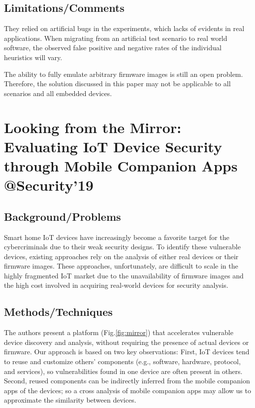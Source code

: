 \subsection{Limitations/Comments}
They relied on artificial bugs in the experiments, which lacks of evidents in real applications. When migrating from an artificial test scenario to real world software, the observed false positive and negative rates of the individual heuristics will vary.

The ability to fully emulate arbitrary firmware images is still an open problem. Therefore, the solution discussed in this paper may not be applicable to all scenarios and all embedded devices. 

\newpage

\section{Looking from the Mirror: Evaluating IoT Device Security through Mobile Companion Apps @Security'19}
\subsection{Background/Problems}
Smart home IoT devices have increasingly become a favorite target for the cybercriminals due to their weak security designs. To identify these vulnerable devices, existing approaches rely on the analysis of either real devices or their firmware images. These approaches, unfortunately, are difficult to scale in the highly fragmented IoT market due to the unavailability of firmware images and the high cost involved in acquiring real-world devices for security analysis.

\subsection{Methods/Techniques}
The authors present a platform (Fig.\ref{fig:mirror}) that accelerates vulnerable device discovery and analysis, without requiring the presence of actual devices or firmware. Our approach is based on two key observations: First, IoT devices tend to reuse and customize others’ components (e.g., software, hardware, protocol, and services), so vulnerabilities found in one device are often present in others. Second, reused components can be indirectly inferred from the mobile companion apps of the devices; so a cross analysis of mobile companion apps may allow us to approximate the similarity between devices.

